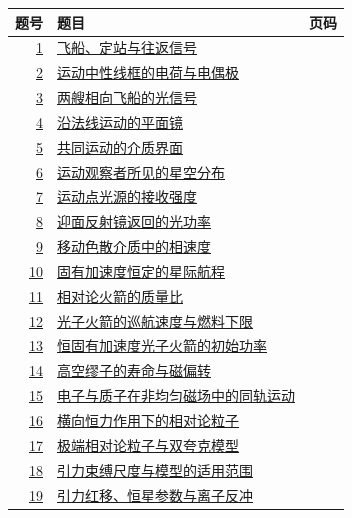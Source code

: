 \documentclass[UTF8,fontset=fandol,a4paper,11pt]{ctexart}
\begin{document}
\begin{longtable}{@{}r p{113mm} r@{}}\toprule 题号 & 题目 & 页码\\\midrule

\hyperref[q:1]{1} & \hyperref[q:1]{飞船、定站与往返信号} & \pageref{q:1} \\

\hyperref[q:2]{2} & \hyperref[q:2]{运动中性线框的电荷与电偶极} & \pageref{q:2} \\

\hyperref[q:3]{3} & \hyperref[q:3]{两艘相向飞船的光信号} & \pageref{q:3} \\

\hyperref[q:4]{4} & \hyperref[q:4]{沿法线运动的平面镜} & \pageref{q:4} \\

\hyperref[q:5]{5} & \hyperref[q:5]{共同运动的介质界面} & \pageref{q:5} \\

\hyperref[q:6]{6} & \hyperref[q:6]{运动观察者所见的星空分布} & \pageref{q:6} \\

\hyperref[q:7]{7} & \hyperref[q:7]{运动点光源的接收强度} & \pageref{q:7} \\

\hyperref[q:8]{8} & \hyperref[q:8]{迎面反射镜返回的光功率} & \pageref{q:8} \\

\hyperref[q:9]{9} & \hyperref[q:9]{移动色散介质中的相速度} & \pageref{q:9} \\

\hyperref[q:10]{10} & \hyperref[q:10]{固有加速度恒定的星际航程} & \pageref{q:10} \\

\hyperref[q:11]{11} & \hyperref[q:11]{相对论火箭的质量比} & \pageref{q:11} \\

\hyperref[q:12]{12} & \hyperref[q:12]{光子火箭的巡航速度与燃料下限} & \pageref{q:12} \\

\hyperref[q:13]{13} & \hyperref[q:13]{恒固有加速度光子火箭的初始功率} & \pageref{q:13} \\

\hyperref[q:14]{14} & \hyperref[q:14]{高空缪子的寿命与磁偏转} & \pageref{q:14} \\

\hyperref[q:15]{15} & \hyperref[q:15]{电子与质子在非均匀磁场中的同轨运动} & \pageref{q:15} \\

\hyperref[q:16]{16} & \hyperref[q:16]{横向恒力作用下的相对论粒子} & \pageref{q:16} \\

\hyperref[q:17]{17} & \hyperref[q:17]{极端相对论粒子与双夸克模型} & \pageref{q:17} \\

\hyperref[q:18]{18} & \hyperref[q:18]{引力束缚尺度与模型的适用范围} & \pageref{q:18} \\

\hyperref[q:19]{19} & \hyperref[q:19]{引力红移、恒星参数与离子反冲} & \pageref{q:19} \\

\bottomrule\end{longtable}
\end{document}
